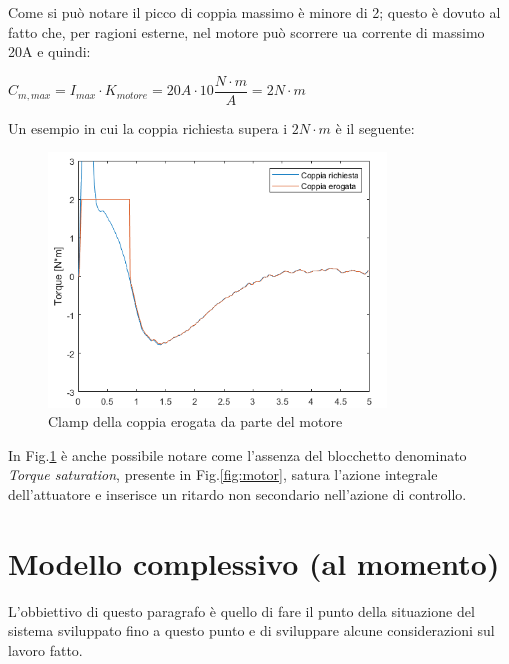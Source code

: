 Come si può notare il picco di coppia massimo è minore di 2; questo è dovuto al fatto che, per ragioni esterne, nel motore può scorrere ua corrente di massimo 20A e quindi:
\begin{center}
	$C_{m,max} = I_{max}\cdot{K_{motore}} = 20 A\cdot{10 \dfrac{N\cdot{m}}{A}}=2N\cdot{m}$
\end{center}

Un esempio in cui la coppia richiesta supera i $2N\cdot{m}$ è il seguente:
\begin{figure}[H]
	\centering   	
	\includegraphics[width=0.8\textwidth]{Immagini/saturazione.png}
	\caption{Clamp della coppia erogata da parte del motore}
	\label{fig:clamp_motore}
\end{figure}
In Fig.\ref{fig:clamp_motore} è anche possibile notare come l'assenza del blocchetto denominato \textit{Torque saturation}, presente in Fig.\ref{fig:motor}, satura l'azione integrale dell'attuatore e inserisce un ritardo non secondario nell'azione di controllo.
\section{Modello complessivo (al momento)}
L'obbiettivo di questo paragrafo è quello di fare il punto della situazione del sistema sviluppato fino a questo punto e di sviluppare alcune considerazioni sul lavoro fatto.

